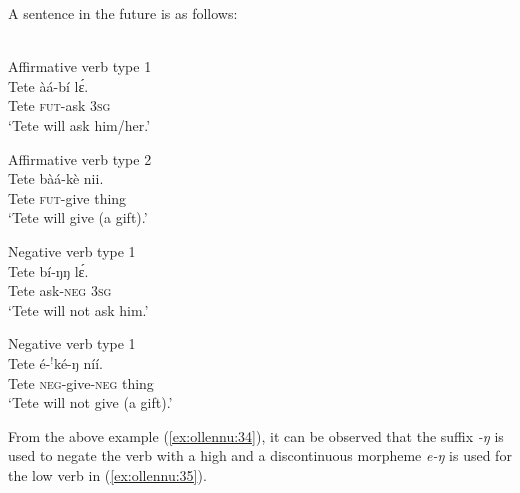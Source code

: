 \documentclass[output=paper
,newtxmath
,modfonts
,nonflat]{langsci/langscibook}
\begin{document}
A sentence in the future is as follows:\\\\
\begin{minipage}{.5\textwidth}

\ea Affirmative verb type 1 \label{ex:ollennu:32}\\
\gll Tete \`a\'a-b\'i l\'ɛ.\\
Tete \textsc{fut}-ask 3\textsc{sg} \\
\glt `Tete will ask him/her.'
\z
\end{minipage}
\begin{minipage}{.5\textwidth}

\ea Affirmative verb type 2
\label{ex:ollennu:33}\\
\gll Tete b\`a\'a-k\`e nii.\\
Tete \textsc{fut}-give thing\\
\glt `Tete will give (a gift).'\\
\z
\end{minipage}
\-\vspace{1em}\-
\begin{minipage}{.5\textwidth}
\ea Negative verb type 1 \\ \label{ex:ollennu:34}
\gll Tete b\'i-ŋŋ l\'ɛ.\\
Tete ask-\textsc{neg} 3\textsc{sg}\\
\glt `Tete will not ask him.'
\z
\end{minipage}
\begin{minipage}{.5\textwidth}
\ea Negative verb type 1 \\ \label{ex:ollennu:35}
\gll Tete \'e-$^{!}$k\'e-ŋ n\'i\'i.\\
Tete \textsc{neg}-give-\textsc{neg} thing\\
\glt `Tete will not give (a gift).'\\
\z
\end{minipage}
From the above example (\ref{ex:ollennu:34}), it can be observed that the suffix \textit{-ŋ} is used to negate the verb with a high  and a discontinuous morpheme \textit{e-ŋ} is used for the low  verb in (\ref{ex:ollennu:35}).
\end{document}
